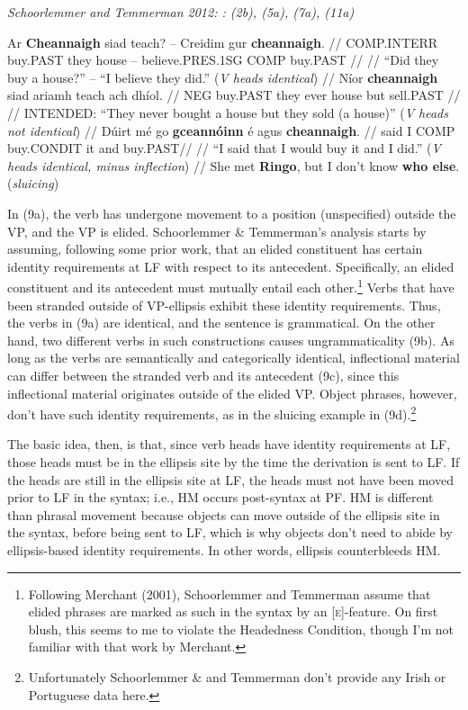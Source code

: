 \documentclass[]{ling-200b-2}
\begin{document}
\pex \textit{Schoorlemmer and Temmerman 2012: : (2b), (5a), (7a), (11a)}

\small
\a
\begingl
\gla Ar \textbf{Cheannaigh} siad teach? -- Creidim gur \textbf{cheannaigh}. //
\glb COMP.INTERR buy.PAST they house -- believe.PRES.1SG COMP buy.PAST //
\glc //
\glft ``Did they buy a house?'' -- ``I believe they did.'' \hfill (\textit{V heads identical}) //
\endgl
\a
\begingl
\gla *Níor \textbf{cheannaigh} siad ariamh teach ach dhíol. //
\glb NEG buy.PAST they ever house but sell.PAST //
\glc //
\glft INTENDED: ``They never bought a house but they sold (a house)'' \hfill (\textit{V heads not identical}) //
\endgl
\a
\begingl
\gla Dúirt mé go \textbf{gceannóinn} é agus \textbf{cheannaigh}. //
\glb said I COMP buy.CONDIT it and buy.PAST//
\glc //
\glft ``I said that I would buy it and I did.'' \hfill (\textit{V heads identical, minus inflection}) //
\endgl
\a She met \textbf{Ringo}, but I don't know \textbf{who else}. \hfill (\textit{sluicing})
\xe

In (9a), the verb has undergone movement to a position (unspecified) outside the VP, and the VP is elided. Schoorlemmer \& Temmerman's analysis starts by assuming, following some prior work, that an elided constituent has certain identity requirements at LF with respect to its antecedent. Specifically, an elided constituent and its antecedent must mutually entail each other.\footnote{ Following Merchant (2001), Schoorlemmer and Temmerman assume that elided phrases are marked as such in the syntax by an [\textsc{e}]-feature. On first blush, this seems to me to violate the Headedness Condition, though I'm not familiar with that work by Merchant.} Verbs that have been stranded outside of VP-ellipsis exhibit these identity requirements. Thus, the verbs in (9a) are identical, and the sentence is grammatical. On the other hand, two different verbs in such constructions causes ungrammaticality (9b). As long as the verbs are semantically and categorically identical, inflectional material can differ between the stranded verb and its antecedent (9c), since this inflectional material originates outside of the elided VP. Object phrases, however, don't have such identity requirements, as in the sluicing example in (9d).\footnote{ Unfortunately Schoorlemmer \& and Temmerman don't provide any Irish or Portuguese data here.}
    
The basic idea, then, is that, since verb heads have identity requirements at LF, those heads must be in the ellipsis site by the time the derivation is sent to LF. If the heads are still in the ellipsis site at LF, the heads must not have been moved prior to LF in the syntax; i.e., HM occurs post-syntax at PF. HM is different than phrasal movement because objects can move outside of the ellipsis site in the syntax, before being sent to LF, which is why objects don't need to abide by ellipsis-based identity requirements. In other words, ellipsis counterbleeds HM.
 
\end{document}

